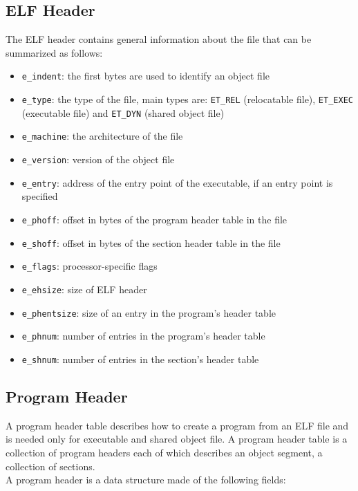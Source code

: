 \subsection{ELF Header}

The ELF header contains general information about the file that can be summarized as follows:

\begin{itemize}
	\item \texttt{e\_indent}: the first bytes are used to identify an object file
	\item \texttt{e\_type}: the type of the file, main types are: \texttt{ET\_REL} (relocatable file), \texttt{ET\_EXEC} (executable file) and \texttt{ET\_DYN} (shared object file)
	\item \texttt{e\_machine}: the architecture of the file
	\item \texttt{e\_version}: version of the object file
	\item \texttt{e\_entry}: address of the entry point of the executable, if an entry point is specified
	\item \texttt{e\_phoff}: offset in bytes of the program header table in the file
	\item \texttt{e\_shoff}: offset in bytes of the section header table in the file
	\item \texttt{e\_flags}: processor-specific flags
	\item \texttt{e\_ehsize}: size of ELF header
	\item \texttt{e\_phentsize}: size of an entry in the program's header table
	\item \texttt{e\_phnum}: number of entries in the program's header table
	\item \texttt{e\_shnum}: number of entries in the section's header table
\end{itemize}

\subsection{Program Header}

A program header table describes how to create a program from an ELF file and is needed only for executable and shared object file. A program header table is a collection of program headers each of which describes an object segment, a collection of sections.\\
A program header is a data structure made of the following fields:

